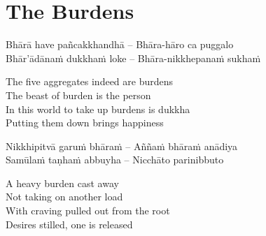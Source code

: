 \suttaRef{[Dhp 85-87.5]}


\section{The Burdens}
\label{burdens}

\begin{leader}
\end{leader}

\begin{twochants}
  Bhārā have pañcakkhandhā – Bhāra-hāro ca puggalo \\
  Bhār'ādānaṁ dukkhaṁ loke – Bhāra-nikkhepanaṁ sukhaṁ \\
\end{twochants}

\begin{english}
  The five aggregates indeed are burdens\\
  The beast of burden is the person\\
  In this world to take up burdens is dukkha\\
  Putting them down brings happiness
\end{english}

\begin{twochants}
  Nikkhipitvā garuṁ bhāraṁ – Aññaṁ bhāraṁ anādiya\\
  Samūlaṁ taṇhaṁ abbuyha – Nicchāto parinibbuto\\
\end{twochants}

\begin{english}
  A heavy burden cast away\\
  Not taking on another load\\
  With craving pulled out from the root\\
  Desires stilled, one is released
\end{english}

\suttaRef{[SN 22.22]}



